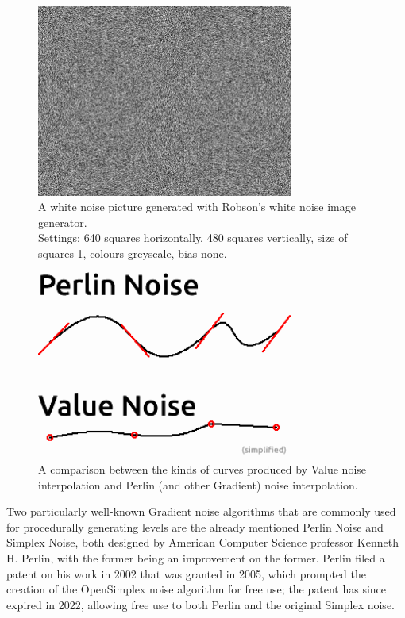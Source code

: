 \begin{figure}[H]
    \centering
    \includegraphics[width=0.75\textwidth]{Images/whitenoisepic.png}
    \caption{A white noise picture generated with Robson's white noise image generator.\cite{whitenoisepicgen}\\Settings: 640 squares horizontally, 480 squares vertically, size of squares 1, colours greyscale, bias none.}
    \label{fig:whitenoisepic}
\end{figure}

\begin{figure}[H]
    \centering
    \includegraphics[width=0.75\textwidth]{Images/valueperlincomparison.png}
    \caption{A comparison between the kinds of curves produced by Value noise interpolation and Perlin (and other Gradient) noise interpolation.\cite{perlinvalue}}
    \label{fig:valueperlincomparison}
\end{figure}

Two particularly well-known Gradient noise algorithms that are commonly used for procedurally generating levels are the already mentioned Perlin Noise and Simplex Noise, both designed by American Computer Science professor Kenneth H. Perlin, with the former being an improvement on the former. Perlin filed a patent on his work in 2002 that was granted in 2005\cite{perlinpatent}, which prompted the creation of the OpenSimplex noise algorithm\cite{enwiki:1102898483} for free use; the patent has since expired in 2022, allowing free use to both Perlin and the original Simplex noise.\cite{perlinpatent}

